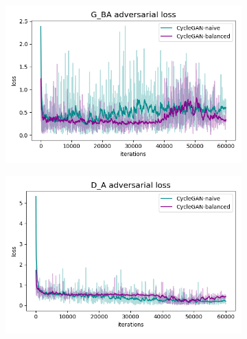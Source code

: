 \begin{figure}[h!]
    \begin{subfigure}{.5\textwidth}
        \centering
        \includegraphics[width=.95\linewidth]{figures/Expt_2/gan_convergence/loss_G_BA.png}
        \caption{}
        \label{fig:loss_G_BA}
    \end{subfigure}
    \begin{subfigure}{.5\textwidth}
        \centering
        \includegraphics[width=.95\linewidth]{figures/Expt_2/gan_convergence/loss_D_A.png}
        \caption{}
        \label{fig:loss_D_A}
    \end{subfigure}
    

\end{figure}
